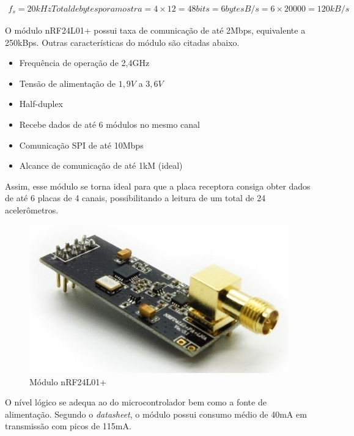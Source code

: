 \documentclass[11pt]{abntex2}
\begin{document}
			\begin{gather*}
				f_s = 20kHz
				Total de bytes por amostra = 4\times 12 = 48 bits = 6 bytes
				B/s = 6\times 20000 = 120kB/s
			\end{gather*}

			O módulo nRF24L01+\cite{nrf} possui taxa de comunicação de até 2Mbps,
			equivalente a 250kBps. Outras características do módulo são
			citadas abaixo.

			\begin{itemize}
				\item Frequência de operação de 2,4GHz
				\item Tensão de alimentação de $1,9V$ a $3,6V$
				\item Half-duplex
				\item Recebe dados de até 6 módulos no mesmo canal
				\item Comunicação SPI de até 10Mbps
				\item Alcance de comunicação de até 1kM (ideal)
			\end{itemize}

			Assim, esse módulo se torna ideal para que a placa receptora consiga
			obter dados de até 6 placas de 4 canais, possibilitando a leitura de
			um total de 24 acelerômetros.

			\begin{figure}[!ht]
				\centering
				\includegraphics[scale = 0.6]{../Fotos/nrf.jpg}
				\caption[Módulo nRF24L01+]{Módulo nRF24L01+ \footnotemark}
			\end{figure}


			O nível lógico se adequa ao do microcontrolador bem como a fonte
			de alimentação. Segundo o \textit{datasheet}, o módulo possui
			consumo médio de 40mA em transmissão com picos de 115mA.
\end{document}
